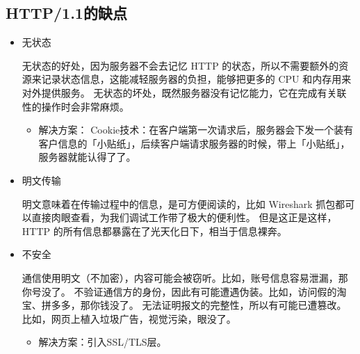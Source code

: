 \documentclass[11pt]{article}
\begin{document}
\subsection{HTTP/1.1的缺点}
\label{sec:org8d9d0a7}
\begin{itemize}
\item 无状态

无状态的好处，因为服务器不会去记忆 HTTP 的状态，所以不需要额外的资源来记录状态信息，这能减轻服务器的负担，能够把更多的 CPU 和内存用来对外提供服务。
无状态的坏处，既然服务器没有记忆能力，它在完成有关联性的操作时会非常麻烦。
\begin{itemize}
\item 解决方案：
Cookie技术：在客户端第一次请求后，服务器会下发一个装有客户信息的「小贴纸」，后续客户端请求服务器的时候，带上「小贴纸」，服务器就能认得了了。
\end{itemize}
\item 明文传输

明文意味着在传输过程中的信息，是可方便阅读的，比如 Wireshark 抓包都可以直接肉眼查看，为我们调试工作带了极大的便利性。
但是这正是这样，HTTP 的所有信息都暴露在了光天化日下，相当于信息裸奔。
\item 不安全

通信使用明文（不加密），内容可能会被窃听。比如，账号信息容易泄漏，那你号没了。
不验证通信方的身份，因此有可能遭遇伪装。比如，访问假的淘宝、拼多多，那你钱没了。
无法证明报文的完整性，所以有可能已遭篡改。比如，网页上植入垃圾广告，视觉污染，眼没了。
\begin{itemize}
\item 解决方案：引入SSL/TLS层。
\end{itemize}
\end{itemize}
\end{document}
